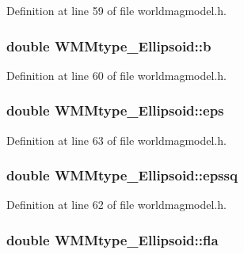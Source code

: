 \-Definition at line 59 of file worldmagmodel.\-h.

\hypertarget{struct_w_m_mtype___ellipsoid_a700f1bab0f80706ecc671bdbb000a0a6}{
\subsubsection[{b}]{\setlength{\rightskip}{0pt plus 5cm}double {\bf \-W\-M\-Mtype\-\_\-\-Ellipsoid\-::b}}}\label{struct_w_m_mtype___ellipsoid_a700f1bab0f80706ecc671bdbb000a0a6}


\-Definition at line 60 of file worldmagmodel.\-h.

\hypertarget{struct_w_m_mtype___ellipsoid_a294084e52ea367c0e1cd4ed78a7cb29d}{
\subsubsection[{eps}]{\setlength{\rightskip}{0pt plus 5cm}double {\bf \-W\-M\-Mtype\-\_\-\-Ellipsoid\-::eps}}}\label{struct_w_m_mtype___ellipsoid_a294084e52ea367c0e1cd4ed78a7cb29d}


\-Definition at line 63 of file worldmagmodel.\-h.

\hypertarget{struct_w_m_mtype___ellipsoid_ab21d8812b21bf6481a495af07bc746ee}{
\subsubsection[{epssq}]{\setlength{\rightskip}{0pt plus 5cm}double {\bf \-W\-M\-Mtype\-\_\-\-Ellipsoid\-::epssq}}}\label{struct_w_m_mtype___ellipsoid_ab21d8812b21bf6481a495af07bc746ee}


\-Definition at line 62 of file worldmagmodel.\-h.

\hypertarget{struct_w_m_mtype___ellipsoid_a001bda565c83d57cf057d66dcc6f92ea}{
\subsubsection[{fla}]{\setlength{\rightskip}{0pt plus 5cm}double {\bf \-W\-M\-Mtype\-\_\-\-Ellipsoid\-::fla}}}\label{struct_w_m_mtype___ellipsoid_a001bda565c83d57cf057d66dcc6f92ea}


